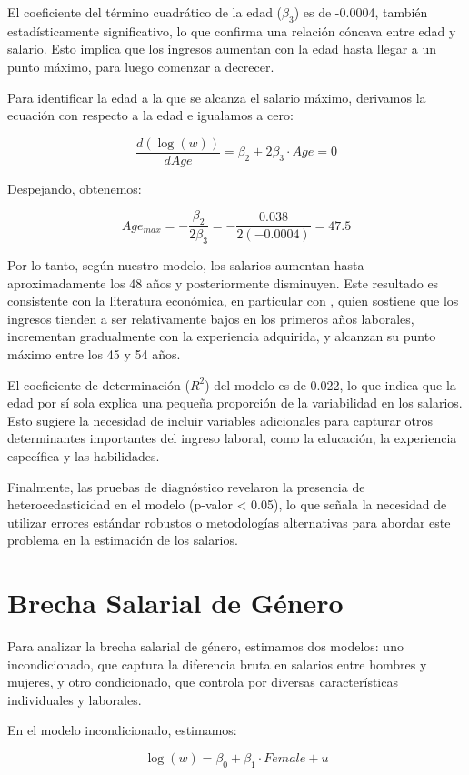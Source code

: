\documentclass[12pt,a4paper,onecolumn]{article}
\begin{document}
El coeficiente del término cuadrático de la edad ($\beta_3$) es de -0.0004, también estadísticamente significativo, lo que confirma una relación cóncava entre edad y salario. Esto implica que los ingresos aumentan con la edad hasta llegar a un punto máximo, para luego comenzar a decrecer.

Para identificar la edad a la que se alcanza el salario máximo, derivamos la ecuación con respecto a la edad e igualamos a cero:

$$ \frac{d(\log(w))}{dAge} = \beta_2 + 2\beta_3 \cdot Age = 0 $$

Despejando, obtenemos:

$$ Age_{max} = -\frac{\beta_2}{2\beta_3} = -\frac{0.038}{2(-0.0004)} = 47.5 $$

Por lo tanto, según nuestro modelo, los salarios aumentan hasta aproximadamente los 48 años y posteriormente disminuyen. Este resultado es consistente con la literatura económica, en particular con \citet{Becker1964}, quien sostiene que los ingresos tienden a ser relativamente bajos en los primeros años laborales, incrementan gradualmente con la experiencia adquirida, y alcanzan su punto máximo entre los 45 y 54 años.

El coeficiente de determinación ($R^2$) del modelo es de 0.022, lo que indica que la edad por sí sola explica una pequeña proporción de la variabilidad en los salarios. Esto sugiere la necesidad de incluir variables adicionales para capturar otros determinantes importantes del ingreso laboral, como la educación, la experiencia específica y las habilidades.

Finalmente, las pruebas de diagnóstico revelaron la presencia de heterocedasticidad en el modelo (p-valor < 0.05), lo que señala la necesidad de utilizar errores estándar robustos o metodologías alternativas para abordar este problema en la estimación de los salarios.

\section{Brecha Salarial de Género}

Para analizar la brecha salarial de género, estimamos dos modelos: uno incondicionado, que captura la diferencia bruta en salarios entre hombres y mujeres, y otro condicionado, que controla por diversas características individuales y laborales.

En el modelo incondicionado, estimamos:

$$ \log(w) = \beta_0 + \beta_1 \cdot Female + u $$
\end{document}
